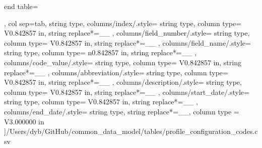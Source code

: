 \begin{landscape}
\begin{longtable}
    end table=\end{longtable},
    col sep=tab,
    string type,
    columns/index/.style={
            string type, 
            column type= V{0.842857 in}, 
            string replace*={_}{\_}
        },
    columns/field_number/.style={
            string type, 
            column type= V{0.842857 in}, 
            string replace*={_}{\_}
        },
    columns/field_name/.style={
            string type, 
            column type= n{0.842857 in}, 
            string replace*={_}{\_}
        },
    columns/code_value/.style={
            string type, 
            column type= V{0.842857 in}, 
            string replace*={_}{\_}
        },
    columns/abbreviation/.style={
            string type, 
            column type= V{0.842857 in}, 
            string replace*={_}{\_}
        },
    columns/description/.style={
            string type, 
            column type= V{0.842857 in}, 
            string replace*={_}{\_}
        },
    columns/start_date/.style={
            string type, 
            column type= V{0.842857 in}, 
            string replace*={_}{\_}
        },
    columns/end_date/.style={
            string type, 
            string replace*={_}{\_},
            column type = V{3.000000 in}
        }
    ]{/Users/dyb/GitHub/common_data_model/tables/profile_configuration_codes.csv}
\end{landscape}
